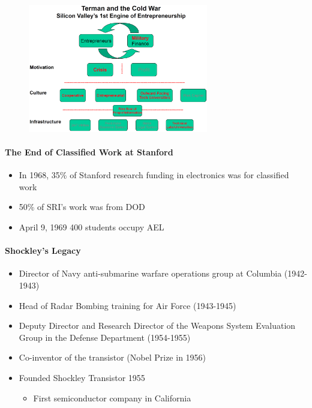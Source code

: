 \begin{figure}[H]
    \centering
    \includegraphics[width=0.7\textwidth]{Pictures/Stanford_cold_war_2.png}
\end{figure}


\paragraph{The End of Classified Work at Stanford}

\begin{itemize}
    \item In 1968, 35\% of Stanford research funding in electronics was for
        classified work
    \item 50\% of SRI's work was from DOD
    \item April 9, 1969 400 students occupy AEL
\end{itemize}

\paragraph{Shockley's Legacy}

\begin{itemize}
    \item Director of Navy anti-submarine warfare operations group at
        Columbia (1942-1943)
    \item Head of Radar Bombing training for Air Force (1943-1945)
    \item Deputy Director and Research Director of the Weapons System Evaluation
        Group in the Defense Department (1954-1955)
    \item Co-inventor of the transistor (Nobel Prize in 1956)
    \item Founded Shockley Transistor 1955
        \begin{itemize}
            \item First semiconductor company in California
        \end{itemize}
\end{itemize}

